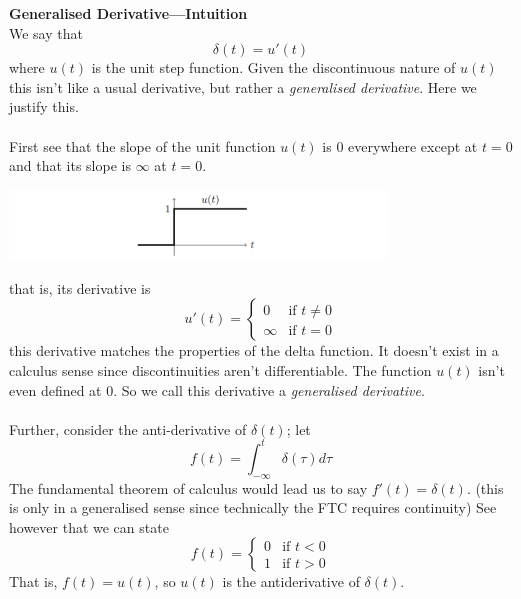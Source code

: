 \documentclass{report}
\begin{document}
\noindent\textbf{Generalised Derivative---Intuition}\\
We say that
\begin{equation*}
\delta(t)=u'(t)
\end{equation*}
where $u(t)$ is the unit step function. Given the discontinuous nature of $u(t)$ this isn't like a usual derivative,
but rather a \textit{generalised derivative}. Here we justify this.\\
\vspace{1mm}\\
First see that the slope of the unit function $u(t)$ is 0 everywhere except at $t=0$ and that its slope is
$\infty$ at $t=0$.
\begin{center}
\includegraphics[width=10cm]{48}\\
\end{center}
that is, its derivative is
\begin{equation*}
u'(t)=\begin{cases}
0&\text{if }t\neq0\\
\infty&\text{if }t=0
\end{cases}
\end{equation*}
this derivative matches the properties of the delta function. It doesn't exist in a calculus sense
since discontinuities aren't differentiable. The function $u(t)$ isn't even defined at 0. 
So we call this derivative a \textit{generalised derivative}.\\
\vspace{1mm}\\
Further, consider the anti-derivative of $\delta(t)$; let
\begin{equation*}
f(t)=\int^t_{-\infty}\delta(\tau)d\tau
\end{equation*}
The fundamental theorem of calculus would lead us to say
$f'(t)=\delta(t)$. (this is only in a generalised sense since technically the FTC requires continuity) See however
that we can state
\begin{equation*}
f(t)=\begin{cases}
0&\text{if }t<0\\
1&\text{if }t>0
\end{cases}
\end{equation*}
That is, $f(t)=u(t)$, so $u(t)$ is the antiderivative of $\delta(t)$.\\
\end{document}
